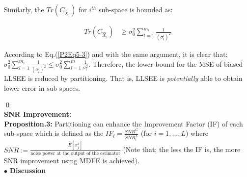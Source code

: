 Similarly, the $Tr(C_{\hat{X}_{i}})$ for $i^{th}$ sub-space is bounded as:  

\begin{equation}\label{P2Eq11-1}
\begin{aligned}
Tr(C_{\hat{X}_{i}}) & \geq  \sigma^{2}_{0} \sum_{l=1}^{m_{i}} \frac{1}{(\sigma^{i}_{l})^{2}}
\end{aligned}
\end{equation}

According to Eq.(\ref{P2Eq5-3}) and with the same argument, it is clear that: $\sigma^{2}_{0} \sum_{l=1}^{m_{i}} \frac{1}{(\sigma^{i}_{l})^{2}} \leq \sigma^{2}_{0} \sum_{l=1}^{m} \frac{1}{\sigma^{2}_{l}}$. Therefore, the lower-bound for the MSE of biased LLSEE is reduced by partitioning. That is, LLSEE is \emph{potentially} able to obtain lower error in sub-spaces.

\qed\\


{\bf SNR Improvement:}\\

\textbf{Proposition.3:} Partitioning can enhance the Improvement Factor (IF) of each sub-space which is defined as the $IF_{i}=\frac{SNR^{G}}{SNR^{L}_{i}}$ (for $i=1, ... ,L$) where $SNR:=\frac{E[x^{2}_{j}]}{\text{noise power at the output of the estimator}}$ (Note that; the less the IF is, the more SNR improvement using MDFE is achieved).\\

$\bullet$ \textbf{Discussion} \\

